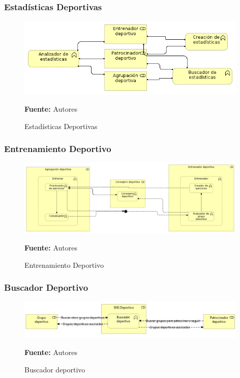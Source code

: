 \subsubsection{Estadísticas Deportivas}

\begin{figure}[!htb]
  \begin{center}
    \includegraphics[width=11cm]{./imagenes/business_functions/estadisticasdeportivas.png}
    \caption{Estadísticas Deportivas}
    \label{fig:estadisticas_deportivas}
    \textbf{Fuente:}  Autores
  \end{center}
\end{figure}

\subsubsection{Entrenamiento Deportivo}

\begin{figure}[!htb]
  \begin{center}
    \includegraphics[width=11cm]{./imagenes/business_functions/entrenamientodeportivo.png}
    \caption{Entrenamiento Deportivo}
    \label{fig:entrenamiento_deportivo}
    \textbf{Fuente:}  Autores
  \end{center}
\end{figure}

\subsubsection{Buscador Deportivo}

\begin{figure}[!htb]
  \begin{center}
    \includegraphics[width=11cm]{./imagenes/business_functions/buscadordeportivo.png}
    \caption{Buscador deportivo}
    \label{fig:BF_BuscadorDeportivo}
    \textbf{Fuente:}  Autores
  \end{center}
\end{figure}


